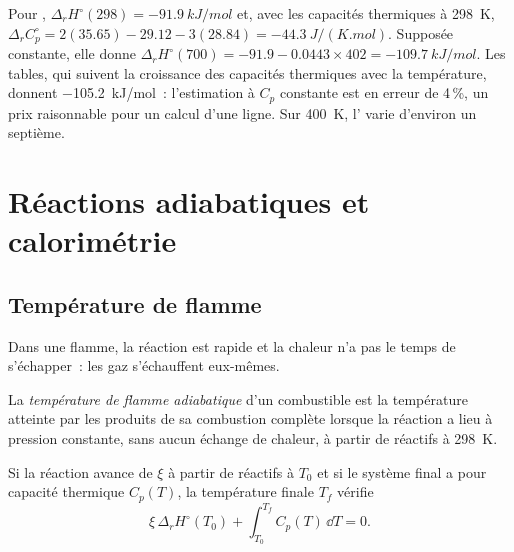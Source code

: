 \begin{example}\label{ex:b2:reaction-enthalpy:kirchhoff}
Pour , $\Delta_r H^\circ(298) =
\qty{-91.9}{kJ/mol}$ et, avec les capacités thermiques à \qty{298}{K},
$\Delta_r C_p^\circ = 2(35.65) - 29.12 - 3(28.84) =
\qty{-44.3}{J/(K.mol)}$. Supposée constante, elle donne $\Delta_r
H^\circ(700) = -91.9 - 0.0443 \times 402 = \qty{-109.7}{kJ/mol}$. Les tables,
qui suivent la croissance des capacités thermiques avec la température, donnent
\qty{-105.2}{kJ/mol}~: l'estimation à $C_p$ constante est en erreur de 4\,\%, un
prix raisonnable pour un calcul d'une ligne. Sur \qty{400}{K}, l' varie d'environ un septième.
\end{example}

\section{Réactions adiabatiques et calorimétrie}

\subsection*{Température de flamme}

Dans une flamme, la réaction est rapide et la chaleur n'a pas le temps de s'échapper~: les
gaz s'échauffent eux-mêmes.

\begin{definition}\label{def:b2:reaction-enthalpy:flame-temperature}
La \emph{température de flamme adiabatique}
d'un combustible est la température atteinte par les produits de sa combustion
complète lorsque la réaction a lieu à pression constante, sans
aucun échange de chaleur, à partir de réactifs à \qty{298}{K}.
\end{definition}

\begin{proposition}\label{prop:b2:reaction-enthalpy:flame}
Si la réaction avance de $\xi$ à partir de réactifs à $T_0$ et si le système final
a pour capacité thermique $C_p(T)$, la température finale $T_f$ vérifie
\[
  \xi\,\Delta_r H^\circ(T_0) + \int_{T_0}^{T_f}C_p(T)\,\dd T = 0 .
\]
\end{proposition}

